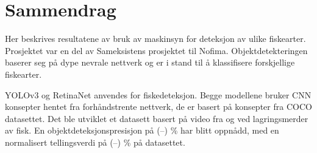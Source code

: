 \section*{Sammendrag}








Her beskrives resultatene av bruk av maskinsyn for deteksjon av ulike fiskearter. Prosjektet var en del av Sameksistens prosjektet til Nofima. Objektdetekteringen baserer seg på dype nevrale nettverk og er i stand til å klassifisere forskjellige fiskearter.

YOLOv3 og RetinaNet anvendes for fiskedeteksjon. Begge modellene bruker CNN konsepter hentet fra forhåndstrente nettverk, de er basert på konsepter fra COCO datasettet. Det ble utviklet et datasett basert på video fra og ved lagringsmerder av fisk. En objektdeteksjonspresisjon på (--) \% har blitt oppnådd, med en normalisert tellingsverdi på  (--) \% på datasettet.

